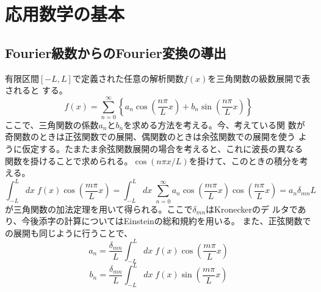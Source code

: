 \chapter{応用数学の基本}
\section{Fourier級数からのFourier変換の導出}
有限区間$[-L, L]$で定義された任意の解析関数$f(x)$を三角関数の級数展開で表されると
する。
\begin{equation}
 f(x) = \sum_{n=0}^{\infty}\left\{a_n\cos \left(\frac{n\pi}{L}x\right)
			   + b_n\sin \left(\frac{n\pi}{L}x\right)\right\}
\end{equation}
ここで、三角関数の係数$a_n$と$b_n$を求める方法を考える。今、考えている関
数が奇関数のときは正弦関数での展開、偶関数のときは余弦関数での展開を使う
ように仮定する。たまたま余弦関数展開の場合を考えると、これに波長の異なる
関数を掛けることで求められる。$\cos(n\pi x/L)$を掛けて、このときの積分を考
える。
\begin{equation}
 \int_{-L}^{L}dx \mspace{5mu} f(x) \cos\left(\frac{m\pi}{L}x\right)
  = \int_{-L}^{L}dx \mspace{5mu}\sum_{n=0}^{\infty}
  a_n\cos\left(\frac{m\pi}{L}x\right)\cos\left(\frac{n\pi}{L}x\right)
  = a_n\delta_{mn}L
\end{equation}
が三角関数の加法定理を用いて得られる。ここで$\delta_{mn}$はKroneckerのデ
ルタであり、今後添字の計算についてはEinsteinの総和規約を用いる。
また、正弦関数での展開も同じように行うことで、
\begin{equation}
 a_n = \frac{\delta_{mn}}{L}\int_{-L}^{L}dx \mspace{5mu} f(x) \cos\left(\frac{m\pi}{L}x\right)
\end{equation}
\begin{equation}
 b_n = \frac{\delta_{mn}}{L}\int_{-L}^{L}dx \mspace{5mu} f(x) \sin\left(\frac{m\pi}{L}x\right)
\end{equation}

